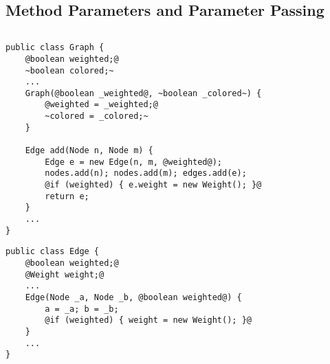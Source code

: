 \subsection{Method Parameters and Parameter Passing}
\begin{frame}[fragile]{\insertsubsection}
		\begin{columns}
\begin{tiny}
\begin{lstlisting}
public class Graph {
	@boolean weighted;@
	~boolean colored;~
	...
	Graph(@boolean _weighted@, ~boolean _colored~) {
		@weighted = _weighted;@
		~colored = _colored;~
	}
	
	Edge add(Node n, Node m) {
		Edge e = new Edge(n, m, @weighted@);
		nodes.add(n); nodes.add(m); edges.add(e);
		@if (weighted) { e.weight = new Weight(); }@
		return e;
	}
	...
}
\end{lstlisting}
\begin{lstlisting}
public class Edge {
	@boolean weighted;@
	@Weight weight;@ 
	...
	Edge(Node _a, Node _b, @boolean weighted@) {
		a = _a; b = _b;
		@if (weighted) { weight = new Weight(); }@
	}
	...
}
\end{lstlisting}
\end{tiny}	
		\end{columns}
\end{frame}

